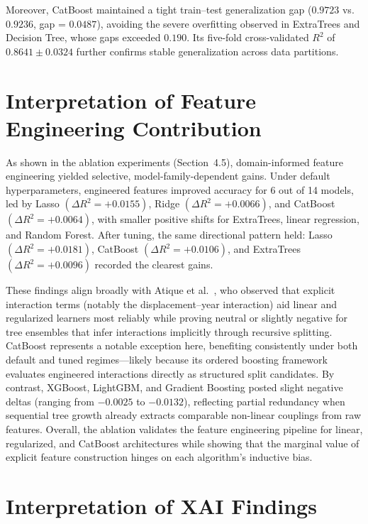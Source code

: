 Moreover, CatBoost maintained a tight train--test generalization gap ($0.9723$ vs. $0.9236$, gap = $0.0487$), avoiding the severe overfitting observed in ExtraTrees and Decision Tree, whose gaps exceeded $0.190$. Its five-fold cross-validated $R^2$ of $0.8641 \pm 0.0324$ further confirms stable generalization across data partitions.


\section{Interpretation of Feature Engineering Contribution}

As shown in the ablation experiments (Section~4.5), domain-informed feature engineering yielded selective, model-family-dependent gains. Under default hyperparameters, engineered features improved accuracy for 6 out of 14 models, led by Lasso \((\Delta R^2 = +0.0155)\), Ridge \((\Delta R^2 = +0.0066)\), and CatBoost \((\Delta R^2 = +0.0064)\), with smaller positive shifts for ExtraTrees, linear regression, and Random Forest. After tuning, the same directional pattern held: Lasso \((\Delta R^2 = +0.0181)\), CatBoost \((\Delta R^2 = +0.0106)\), and ExtraTrees \((\Delta R^2 = +0.0096)\) recorded the clearest gains.

These findings align broadly with Atique et al.~\cite{atique2026explainable}, who observed that explicit interaction terms (notably the displacement--year interaction) aid linear and regularized learners most reliably while proving neutral or slightly negative for tree ensembles that infer interactions implicitly through recursive splitting. CatBoost represents a notable exception here, benefiting consistently under both default and tuned regimes---likely because its ordered boosting framework evaluates engineered interactions directly as structured split candidates. By contrast, XGBoost, LightGBM, and Gradient Boosting posted slight negative deltas (ranging from \(-0.0025\) to \(-0.0132\)), reflecting partial redundancy when sequential tree growth already extracts comparable non-linear couplings from raw features. Overall, the ablation validates the feature engineering pipeline for linear, regularized, and CatBoost architectures while showing that the marginal value of explicit feature construction hinges on each algorithm's inductive bias.


\section{Interpretation of XAI Findings}


